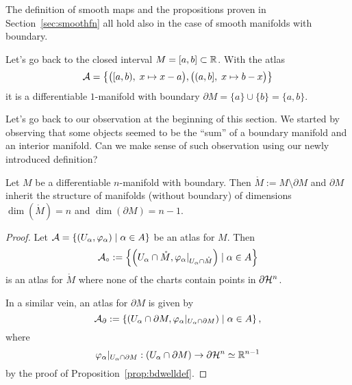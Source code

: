 \begin{remark}
	The definition of smooth maps and the propositions proven in Section~\ref{sec:smoothfn} all hold also in the case of smooth manifolds with boundary.
\end{remark}

\begin{example}\label{ex:mfldbdryinterval}
	Let's go back to the closed interval $M=[a,b]\subset\mathbb{R}$.
	With the atlas
	\begin{equation}
		\mathcal{A}=\big\{
		\big([a,b), \; x\mapsto x-a\big),
		\big((a,b], \; x\mapsto b-x\big)
		\big\}
	\end{equation}
	it is a differentiable $1$-manifold with boundary $\partial M = \{a\} \cup \{b\} = \{a, b\}$.
\end{example}

Let's go back to our observation at the beginning of this section.
We started by observing that some objects seemed to be the ``sum'' of a boundary manifold and an interior manifold.
Can we make sense of such observation using our newly introduced definition?

\begin{proposition}
	Let $M$ be a differentiable $n$-manifold with boundary.
	Then $\mathring M := M\setminus\partial M$ and $\partial M$ inherit the structure of manifolds (without boundary) of dimensions $\dim(\mathring M)=n$ and $\dim(\partial M) = n-1$.
\end{proposition}
\begin{proof}
	Let $\mathcal{A} = \{(U_\alpha,\varphi_\alpha) \mid \alpha\in A\}$ be an atlas for $M$.
	Then
	\begin{equation}
		\mathcal{A}_\circ := \left\{
		\left(
		U_\alpha \cap \mathring M,
		\varphi_\alpha|_{U_\alpha \cap \mathring M}
		\right) \mid \alpha\in A
		\right\}
	\end{equation}
	is an atlas for $\mathring M$ where none of the charts contain points in $\partial\mathcal{H}^n$.

	In a similar vein, an atlas for $\partial M$ is given by
	\begin{equation}
		\mathcal{A}_\partial := \left\{
		\left(
		U_\alpha \cap \partial M,
		\varphi_\alpha|_{U_\alpha \cap \partial M}
		\right) \mid \alpha\in A
		\right\},
	\end{equation}
	where
	\begin{equation}
		\varphi_\alpha|_{U_\alpha \cap \partial M} : (U_\alpha \cap \partial M) \to \partial\mathcal{H}^n\simeq\mathbb{R}^{n-1}
	\end{equation}
	by the proof of Proposition~\ref{prop:bdwelldef}.
\end{proof}


